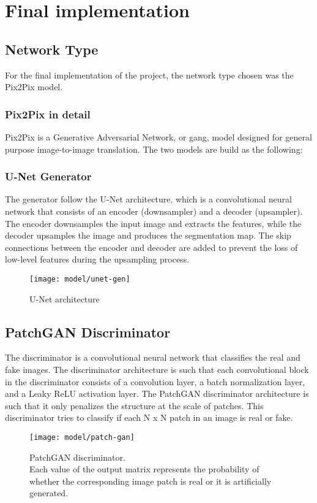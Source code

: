 \section{Final implementation}
\label{sec:final-implementation}
\subsection{Network Type}
\label{subsec:network-type}
For the final implementation of the project, the network type chosen was the Pix2Pix model.
\subsubsection{Pix2Pix in detail}
\label{subsubsec:pix2pix-in-detail}
Pix2Pix is a Generative Adversarial Network, or \gls{gang}, model designed for general
purpose image-to-image translation.
The two models are build as the following:
\subsubsection{U-Net Generator}
The generator follow the U-Net architecture, which is a convolutional neural network that
consists of an encoder (downsampler) and a decoder (upsampler). The encoder downsamples the
input image and extracts the features, while the decoder upsamples the image and produces
the segmentation map. The skip connections between the encoder and decoder are added to
prevent the loss of low-level features during the upsampling process.
\begin{figure}[H]
    \centering
    \texttt{[image: model/unet-gen]}
    \caption{U-Net architecture}
    \label{fig:unet}
\end{figure}
\subsection{PatchGAN Discriminator}
\label{subsec:patchgan-discriminator}
The discriminator is a convolutional neural network that classifies the real and fake
images. The discriminator architecture is such that each convolutional block in the
discriminator consists of a convolution layer, a batch normalization layer, and a Leaky
ReLU activation layer. The PatchGAN discriminator architecture is such that it only penalizes
the structure at the scale of patches. This discriminator tries to classify if each N x N
patch in an image is real or fake.
\begin{figure}[H]
    \centering
    \texttt{[image: model/patch-gan]}
    \caption{PatchGAN discriminator.\\ Each value of the output matrix represents the probability of whether the corresponding image patch is real or it is artificially generated.}
    \label{fig:patchgan}
\end{figure}
